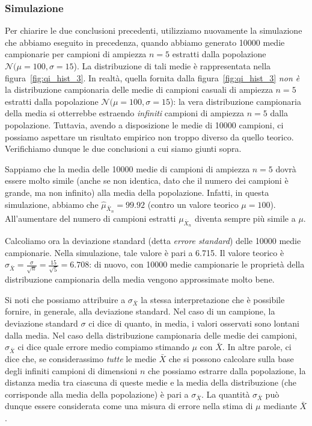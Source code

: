 \subsubsection{Simulazione}

Per chiarire le due conclusioni precedenti, utilizziamo nuovamente la simulazione che abbiamo eseguito in precedenza, quando abbiamo generato \num{10000} medie campionarie per campioni di ampiezza $n = 5$ estratti dalla popolazione $\mathcal{N}(\mu = 100, \sigma = 15$).
La distribuzione di tali medie è rappresentata nella figura~\ref{fig:qi_hist_3}.
In realtà, quella fornita dalla figura~\ref{fig:qi_hist_3} \emph{non è} la distribuzione campionaria delle medie di campioni casuali di ampiezza $n=5$ estratti dalla popolazione $\mathcal{N}(\mu = 100, \sigma = 15$): la vera distribuzione campionaria della media si otterrebbe estraendo \emph{infiniti} campioni di ampiezza $n = 5$ dalla popolazione.
Tuttavia, avendo a disposizione le medie di \num{10000} campioni, ci possiamo aspettare un risultato empirico non troppo diverso da quello teorico.
Verifichiamo dunque le due conclusioni a cui siamo giunti sopra.

Sappiamo che la media delle \num{10000} medie di campioni di ampiezza $n=5$ dovrà essere molto simile (anche se non identica, dato che il numero dei campioni è grande, ma non infinito) alla media della popolazione.
Infatti, in questa simulazione, abbiamo che $\hat{\mu}_{\bar{X}_n} = 99.92$ (contro un valore teorico $\mu=100$).
All'aumentare del numero di campioni estratti $\mu_{\bar{X}_n}$ diventa sempre più simile a $\mu$.

Calcoliamo ora la deviazione standard (detta \emph{errore standard}) delle \num{10000} medie campionarie.
Nella simulazione, tale valore è pari a 6.715.
Il valore teorico è $\sigma_{\bar{X}} = \frac{\sigma}{\sqrt{n}} = \frac{15}{\sqrt{5}} = 6.708$: di nuovo, con \num{10000} medie campionarie le proprietà della distribuzione campionaria della media vengono approssimate molto bene.

Si noti che possiamo attribuire a $\sigma_{\bar{X}}$ la stessa interpretazione che è possibile fornire, in generale, alla deviazione standard.
Nel caso di un campione, la deviazione standard $\sigma$ ci dice di quanto, in media, i valori osservati sono lontani dalla media.
Nel caso della distribuzione campionaria delle medie dei campioni, $\sigma_{\bar{X}}$ ci dice quale errore medio compiamo stimando $\mu$ con $\bar{X}$.
In altre parole, ci dice che, se considerassimo \emph{tutte} le medie $\bar{X}$ che si possono calcolare sulla base degli infiniti campioni di dimensioni $n$ che possiamo estrarre dalla popolazione, la distanza media tra ciascuna di queste medie e la media della distribuzione (che corrisponde alla media della popolazione) è pari a $\sigma_{\bar{X}}$.
La quantità $\sigma_{\bar{X}}$ può dunque essere considerata come una misura di errore nella stima di $\mu$ mediante $\bar{X}$.


